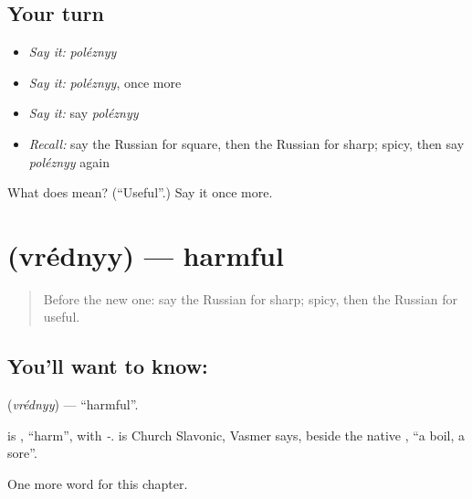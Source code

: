 \subsection*{Your turn}
\begin{itemize}
\raggedright
  \item \emph{Say it:} \emph{poléznyy}
  \item \emph{Say it:} \emph{poléznyy}, once more
  \item \emph{Say it:} say \emph{poléznyy}
  \item \emph{Recall:} say the Russian for square, then the Russian for sharp; spicy, then say \emph{poléznyy} again
\end{itemize}

\begin{tcolorbox}[breakable,colback=teal!4,colframe=teal!35!black,title={Before you move on}]
What does  mean? (\textquotedblleft{}Useful\textquotedblright{}.) Say it once more.
\end{tcolorbox}
\section[\texorpdfstring{\ru{вредный} (vrédnyy)}{вредный (vrédnyy)}]{ (vrédnyy) — harmful}

\label{lesson:RU-C188-vrednyy}



\begin{quote}
Before the new one: say the Russian for sharp; spicy, then the Russian for useful.
\end{quote}

\subsection*{You'll want to know: }
\textbf{} (\emph{vrédnyy}) — \textquotedblleft{}harmful\textquotedblright{}.

\begin{cousinweb}
\textbf{} is \emph{}, \textquotedblleft{}harm\textquotedblright{}, with \emph{-}. \emph{} is Church Slavonic, Vasmer says, beside the native \emph{}, \textquotedblleft{}a boil, a sore\textquotedblright{}.
\end{cousinweb}

\begin{grammarlens}[title={What you've built}]
One more word for this chapter.
\end{grammarlens}

